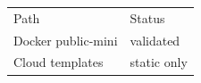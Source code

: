 \begin{tabular}{ll}Path & Status \\ Docker public-mini & validated \\ Cloud templates & static only \\\end{tabular}
